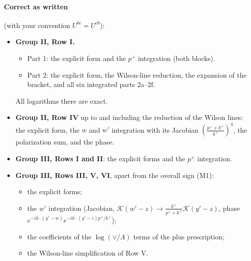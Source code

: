 \documentclass[10pt]{article}
\numberwithin{equation}{section}
\begin{document}
\paragraph{Correct as written} (with your convention $U^{bc}=U^{cb}$):
\begin{itemize}
\item \textbf{Group II, Row I.}
\begin{itemize}
\item Part 1: the explicit form and the $p^+$ integration (both blocks).
\item Part 2: the explicit form, the Wilson-line reduction, the expansion of the bracket, and all six integrated parts 2a--2f.
\end{itemize}
All logarithms there are exact.
\item \textbf{Group II, Row IV} up to and including the reduction of the Wilson lines: the explicit form, the $w$ and $w'$ integration with its Jacobian $(\frac{p^++k^+}{k^+})^4$, the polarization sum, and the phase.
\item \textbf{Group III, Rows I and II}: the explicit forms and the $p^+$ integration.
\item \textbf{Group III, Rows III, V, VI}, apart from the overall sign (M1):
\begin{itemize}
\item the explicit forms;
\item the $w'$ integration (Jacobian, $\mathcal K(w'-z)\to\frac{k^+}{p^++k^+}\mathcal K(y'-z)$, phase $e^{-ik\cdot(y'-w)}e^{-ik\cdot(y'-z)p^+/k^+}$);
\item the coefficients of the $\log(\vee/\Lambda)$ terms of the plus prescription;
\item the Wilson-line simplification of Row V.
\end{itemize}
\end{itemize}
\end{document}
